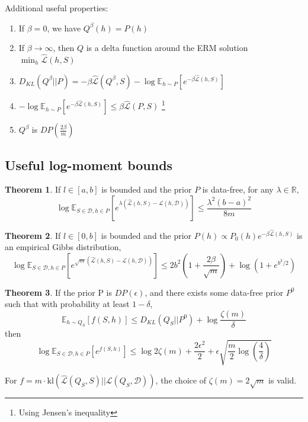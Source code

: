 \documentclass{article}
\theoremstyle{definition}
\newtheorem{theorem}{Theorem}[section]
\newcommand{\Expect}[2]{\mathbb{E}_{#1}\left [#2 \right ]}
\begin{document}
Additional useful properties:
\begin{enumerate}
	\item If $\beta=0$, we have $Q^\beta(h)=P(h)$
	\item If $\beta\rightarrow \infty$, then $Q$ is a delta function around the ERM solution $\min_h \hat{\mathcal{L}}(h,S)$
	\item $D_{KL}(Q^\beta||P)=-\beta\hat{\mathcal{L}}(Q^\beta, S)-\log\Expect{h\sim P}{e^{-\beta \hat{\mathcal{L}}(h, S)}}$
	\item $-\log\Expect{h\sim P}{e^{-\beta \hat{\mathcal{L}}(h, S)}}\leq \beta\hat{\mathcal{L}}(P,S)$ \footnote{Using Jensen's inequality}
	\item $Q^\beta$ is $DP(\frac{2\beta}{m})$ \citep{McSherry2007}
\end{enumerate}

\subsection{Useful log-moment bounds} \label{append:log-moment-stuff}

\begin{theorem}
	If $l\in[a,b]$ is bounded and the prior $P$ is data-free, for any $\lambda\in \mathbb{R}$,
	$$\log \Expect{S\in \mathcal{D}, h\in P}{e^{\lambda(\hat{\mathcal{L}}(h,S)-\mathcal{L}(h,\mathcal{D}))}} \leq \frac{\lambda^2(b-a)^2}{8m}$$
\end{theorem}

\begin{theorem} \citep{Rivasplata2020}
	If $l\in[0,b]$ is bounded and the prior $P(h)\propto P_0(h)e^{-\beta\hat{\mathcal{L}}(h,S)}$ is an empirical Gibbs distribution, 
	$$\log \Expect{S\in \mathcal{D}, h\in P}{e^{\sqrt{m}(\hat{\mathcal{L}}(h,S)-\mathcal{L}(h,\mathcal{D}))}} \leq 2b^2(1+\frac{2\beta}{\sqrt{m}})+\log(1+e^{b^2/2})$$
\end{theorem}

\begin{theorem} \citep{Rivasplata2020, Dziugaite2018}
	If the prior P is $DP(\epsilon)$, and there exists some data-free prior $P^0$ such that with probability at least $1-\delta$,
	$$\Expect{h\sim Q_S}{f(S,h)} \leq D_{KL}(Q_S||P^0)+\log\frac{\zeta(m)}{\delta}$$
	then 
	$$\log \Expect{S\in \mathcal{D}, h\in P}{e^{f(S,h)}} \leq \log 2\zeta(m) + \frac{2\epsilon^2}{2}+\epsilon\sqrt{\frac{m}{2}\log(\frac{4}{\delta})}$$
	
	For $f=m\cdot \mathrm{kl}(\hat{\mathcal{L}}(Q_S,S)||\mathcal{L}(Q_S,\mathcal{D}))$, the choice of $\zeta(m)=2\sqrt{m}$ is valid.
\end{theorem}
\end{document}
